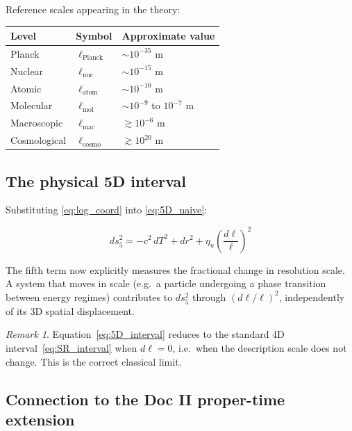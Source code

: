 \documentclass[11pt, a4paper, oneside]{article}
\theoremstyle{definition}
\theoremstyle{plain}
\theoremstyle{remark}
\newtheorem{remark}{Remark}[section]
\newcommand{\dsfive}{ds_5^2}
\begin{document}
\noindent
Reference scales appearing in the theory:
\begin{center}
\begin{tabular}{lll}
  \toprule
  Level & Symbol & Approximate value \\
  \midrule
  Planck    & $\ell_\mathrm{Planck}$ & $\sim 10^{-35}$ m \\
  Nuclear   & $\ell_\mathrm{nuc}$    & $\sim 10^{-15}$ m \\
  Atomic    & $\ell_\mathrm{atom}$   & $\sim 10^{-10}$ m \\
  Molecular & $\ell_\mathrm{mol}$    & $\sim 10^{-9}$ to $10^{-7}$ m \\
  Macroscopic & $\ell_\mathrm{mac}$  & $\gtrsim 10^{-6}$ m \\
  Cosmological & $\ell_\mathrm{cosmo}$ & $\gtrsim 10^{20}$ m \\
  \bottomrule
\end{tabular}
\end{center}

\subsection{The physical 5D interval}

Substituting \eqref{eq:log_coord} into \eqref{eq:5D_naive}:

\begin{equation}
  \boxed{
    \dsfive = -c^2\,dT^2 + dr^2 + \eta_u \left(\frac{d\ell}{\ell}\right)^2
  }
  \label{eq:5D_interval}
\end{equation}

\noindent
The fifth term now explicitly measures the fractional change in resolution
scale.
A system that moves in scale (e.g.\ a particle undergoing a phase
transition between energy regimes) contributes to $ds_5^2$ through
$(d\ell/\ell)^2$, independently of its 3D spatial displacement.

\begin{remark}
  Equation~\eqref{eq:5D_interval} reduces to the standard
  4D interval~\eqref{eq:SR_interval} when $d\ell = 0$, i.e.\ when
  the description scale does not change.
  This is the correct classical limit.
\end{remark}

\subsection{Connection to the Doc II proper-time extension}
\end{document}
